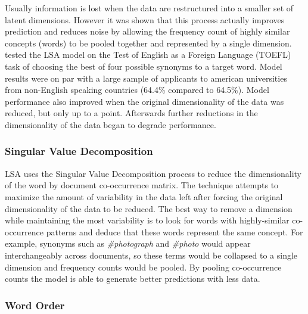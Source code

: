 \documentclass[man,floatsintext,donotrepeattitle]{apa6}
\begin{document}
Usually information is lost when the data are restructured into a smaller set of latent dimensions.
However it was shown that this process actually improves prediction and reduces noise by allowing the frequency count of highly similar concepts (words) to be pooled together and represented by a single dimension.
\textcite{Landauer1997} tested the LSA model on the Test of English as a Foreign Language (TOEFL) task of choosing the best of four possible synonyms to a target word.
Model results were on par with a large sample of applicants to american universities from non-English speaking countries (64.4\% compared to 64.5\%).
Model performance also improved when the original dimensionality of the data was reduced, but only up to a point.
Afterwards further reductions in the dimensionality of the data began to degrade performance.

\subsubsection{Singular Value Decomposition}

LSA uses the Singular Value Decomposition process to reduce the dimensionality of the word by document co-occurrence matrix.
The technique attempts to maximize the amount of variability in the data left after forcing the original dimensionality of the data to be reduced.
The best way to remove a dimension while maintaining the most variability is to look for words with highly-similar co-occurrence patterns and deduce that these words represent the same concept.
For example, synonyms such as \emph{\#photograph} and \emph{\#photo} would appear interchangeably across documents, so these terms would be collapsed to a single dimension and frequency counts would be pooled.
By pooling co-occurrence counts the model is able to generate better predictions with less data.

\subsubsection{Word Order}
\end{document}
